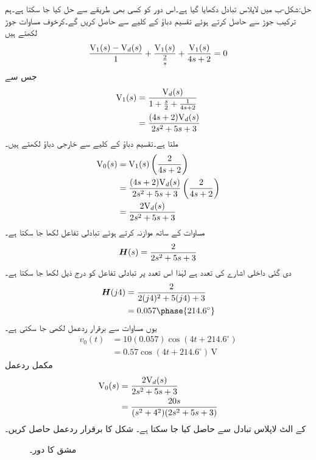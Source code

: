 حل:شکل-ب میں لاپلاس تبادل دکھایا گیا ہے۔اس دور کو کسی بھی طریقے سے حل کیا جا سکتا ہے۔ہم ترکیب جوڑ سے  حاصل کرتے ہوئے تقسیم دباؤ کے کلیے سے   حاصل کریں گے۔کرخوف مساوات جوڑ لکھتے ہیں
\begin{align*}
\frac{{{\textup{V}}}_1(s)-{{\textup{V}}}_d(s)}{1}+\frac{{{\textup{V}}}_1(s)}{\frac{2}{s}}+\frac{{{\textup{V}}}_1(s)}{4s+2}=0
\end{align*}
جس سے
\begin{align*}
{\ensuremath{{\textup{V}}}}_1(s)&=\frac{{{\textup{V}}}_d(s)}{1+\frac{s}{2}+\frac{1}{4s+2}}\\
&=\frac{(4s+2){{\textup{V}}}_d(s)}{2s^2+5s+3}
\end{align*}
ملتا ہے۔تقسیم دباؤ کے کلیے سے خارجی دباؤ لکھتے ہیں۔
\begin{align*}
{\ensuremath{{\textup{V}}}}_0(s)&={{\textup{V}}}_1(s)\left(\frac{2}{4s+2}\right)\\
&=\frac{(4s+2){{\textup{V}}}_d(s)}{2s^2+5s+3}\left(\frac{2}{4s+2}\right)\\
&=\frac{2{{\textup{V}}}_d(s)}{2s^2+5s+3}
\end{align*}
مساوات  کے ساتھ موازنہ کرتے ہوئے تبادلی تفاعل لکھا جا سکتا ہے۔
\begin{align*}
{\ensuremath{{\boldsymbol{H}}}}(s)=\frac{2}{2s^2+5s+3}
\end{align*}
دی گئی داخلی اشارے کی تعدد  ہے لہٰذا اس تعدد پر تبادلی تفاعل کو درج ذیل لکھا جا سکتا ہے۔
\begin{align*}
\bH(j4)&=\frac{2}{2(j4)^2+5(j4)+3}\\
&=0.057\phase{214.6^{\circ}}
\end{align*}
یوں مساوات  سے برقرار ردعمل لکھی جا سکتی ہے۔
\begin{align*}
v_0(t)&=10(0.057)\cos(4t+214.6^{\circ})\\
&=0.57\cos(4t+214.6^{\circ})\,\si{\volt}
\end{align*}
مکمل ردعمل 
\begin{align*}
{\ensuremath{{\textup{V}}}}_0(s)&=\frac{2{{\textup{V}}}_d(s)}{2s^2+5s+3}\\
&=\frac{20s}{(s^2+4^2)(2s^2+5s+3)}
\end{align*}
کے  الٹ لاپلاس تبادل سے حاصل کیا جا سکتا ہے۔
شکل  کا برقرار ردعمل حاصل کریں۔
\begin{figure}
\centering
{}
\caption{مشق  کا دور۔}
\label{شکل_لاپلاس_استعمال_مشق_برقرار_الف}
\end{figure}

